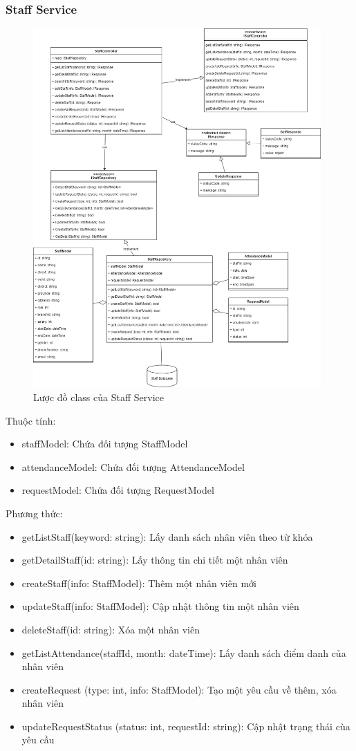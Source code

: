\subsubsection{Staff Service}
\begin{figure}[!htp]
	\centering
	\includegraphics[width=11cm]{img/Architecture/service/StaffService.png}
	\newline
	\caption{Lược đồ class của Staff Service}
\end{figure}

Thuộc tính:
\begin{itemize}
	\item staffModel: Chứa đối tượng StaffModel
	\item attendanceModel: Chứa đối tượng AttendanceModel
	\item requestModel: Chứa đối tượng RequestModel
\end{itemize}
Phương thức:
\begin{itemize}
	\item getListStaff(keyword: string): Lấy danh sách nhân viên theo từ khóa
	\item getDetailStaff(id: string): Lấy thông tin chi tiết một nhân viên
	\item createStaff(info: StaffModel): Thêm một nhân viên mới
	\item updateStaff(info: StaffModel): Cập nhật thông tin một nhân viên
	\item deleteStaff(id: string): Xóa một nhân viên
	\item getListAttendance(staffId, month: dateTime): Lấy danh sách điểm danh của nhân viên
	\item createRequest (type: int, info: StaffModel): Tạo một yêu cầu về thêm, xóa nhân viên
	\item updateRequestStatus (status: int, requestId: string): Cập nhật trạng thái cùa yêu cầu
\end{itemize}


